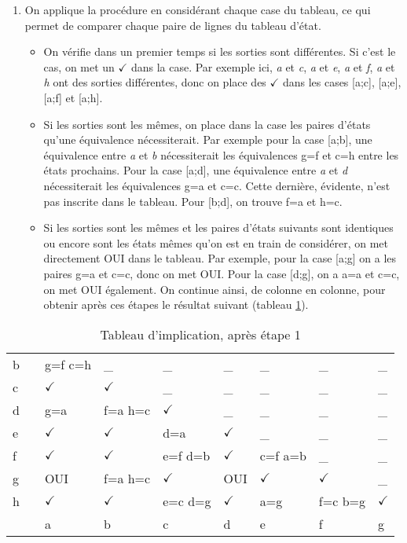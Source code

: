 \documentclass[11pt]{article}
\begin{document}
\begin{enumerate}
\item On applique la procédure en considérant chaque case du tableau, ce
qui permet de comparer chaque paire de lignes du tableau d'état.

\begin{itemize}
\item On vérifie dans un premier temps si les sorties sont
différentes. Si c'est le cas, on met un \(\checkmark\) dans la
case. Par exemple ici, \emph{a} et \emph{c}, \emph{a} et \emph{e}, \emph{a} et \emph{f}, \emph{a} et
\emph{h} ont des sorties différentes, donc on place des \(\checkmark\)
dans les cases [a;c], [a;e], [a;f] et [a;h].
\item Si les sorties sont les mêmes, on place dans la case les paires
d'états qu'une équivalence nécessiterait. Par exemple pour la
case [a;b], une équivalence entre \emph{a} et \emph{b} nécessiterait les
équivalences g=f et c=h entre les états prochains. Pour la case
[a;d], une équivalence entre \emph{a} et \emph{d} nécessiterait les
équivalences g=a et c=c. Cette dernière, évidente, n'est pas
inscrite dans le tableau. Pour [b;d], on trouve f=a et h=c.
\item Si les sorties sont les mêmes et les paires d'états suivants sont
identiques ou encore sont les états mêmes qu'on est en train de
considérer, on met directement OUI dans le tableau. Par exemple,
pour la case [a;g] on a les paires g=a et c=c, donc on met
OUI. Pour la case [d;g], on a a=a et c=c, on met OUI
également. On continue ainsi, de colonne en colonne, pour obtenir
après ces étapes le résultat suivant (tableau \ref{tab:orgf34f307}).
\end{itemize}
\end{enumerate}

\begin{table}[htbp]
\caption{\label{tab:orgf34f307}Tableau d'implication, après étape 1}
\centering
\begin{tabular}{lllllllll}
b &  & g=f c=h & \_ & \_ & \_ & \_ & \_ & \_\\
c &  & \(\checkmark\) & \(\checkmark\) & \_ & \_ & \_ & \_ & \_\\
d &  & g=a & f=a h=c & \(\checkmark\) & \_ & \_ & \_ & \_\\
e &  & \(\checkmark\) & \(\checkmark\) & d=a & \(\checkmark\) & \_ & \_ & \_\\
f &  & \(\checkmark\) & \(\checkmark\) & e=f d=b & \(\checkmark\) & c=f a=b & \_ & \_\\
g &  & OUI & f=a h=c & \(\checkmark\) & OUI & \(\checkmark\) & \(\checkmark\) & \_\\
h &  & \(\checkmark\) & \(\checkmark\) & e=c d=g & \(\checkmark\) & a=g & f=c b=g & \(\checkmark\)\\
\hline
 &  & a & b & c & d & e & f & g\\
\end{tabular}
\end{table}
\end{document}

